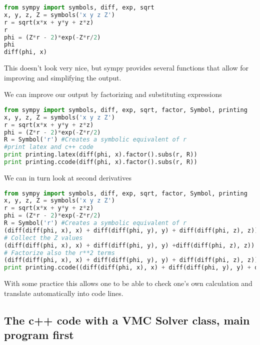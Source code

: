 \documentclass[graybox,sectrefs,envcountresetchap,open=right]{svmonodo}
\begin{document}
\begin{lstlisting}[language=Python,style=blue1]
from sympy import symbols, diff, exp, sqrt
x, y, z, Z = symbols('x y z Z')
r = sqrt(x*x + y*y + z*z)
r
phi = (Z*r - 2)*exp(-Z*r/2)
phi
diff(phi, x)
\end{lstlisting}
This doesn't look very nice, but sympy provides several functions that allow for improving and simplifying the output.



We can improve our output by factorizing and substituting expressions
\begin{lstlisting}[language=Python,style=blue1]
from sympy import symbols, diff, exp, sqrt, factor, Symbol, printing
x, y, z, Z = symbols('x y z Z')
r = sqrt(x*x + y*y + z*z)
phi = (Z*r - 2)*exp(-Z*r/2)
R = Symbol('r') #Creates a symbolic equivalent of r
#print latex and c++ code
print printing.latex(diff(phi, x).factor().subs(r, R))
print printing.ccode(diff(phi, x).factor().subs(r, R))
\end{lstlisting}




We can in turn look at second derivatives
\begin{lstlisting}[language=Python,style=blue1]
from sympy import symbols, diff, exp, sqrt, factor, Symbol, printing
x, y, z, Z = symbols('x y z Z')
r = sqrt(x*x + y*y + z*z)
phi = (Z*r - 2)*exp(-Z*r/2)
R = Symbol('r') #Creates a symbolic equivalent of r
(diff(diff(phi, x), x) + diff(diff(phi, y), y) + diff(diff(phi, z), z)).factor().subs(r, R)
# Collect the Z values
(diff(diff(phi, x), x) + diff(diff(phi, y), y) +diff(diff(phi, z), z)).factor().collect(Z).subs(r, R)
# Factorize also the r**2 terms
(diff(diff(phi, x), x) + diff(diff(phi, y), y) + diff(diff(phi, z), z)).factor().collect(Z).subs(r, R).subs(r**2, R**2).factor()
print printing.ccode((diff(diff(phi, x), x) + diff(diff(phi, y), y) + diff(diff(phi, z), z)).factor().collect(Z).subs(r, R).subs(r**2, R**2).factor())
\end{lstlisting}
With some practice this allows one to be able to check one's own calculation and translate automatically into code lines.


\subsection{The c++ code with a VMC Solver class, main program first}
\end{document}
